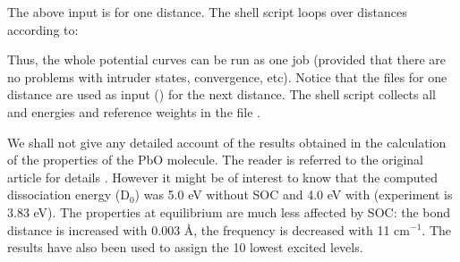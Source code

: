 The above input is for one distance. The shell script loops over distances
according to:


Thus, the whole potential curves can be run as one job (provided that there are
no problems with intruder states, convergence, etc). Notice that the
 files for one distance are used as input () for the
next distance. The shell script collects all  and 
 energies and reference weights in the file . 

We shall not give any detailed account of the results obtained in the
calculation of the properties of the PbO molecule. The reader is referred to the
original article for details \cite{Roos:03h}. However it might be of interest to
know that the computed dissociation energy (D$_0$) was 5.0 eV without SOC and
4.0 eV with (experiment is 3.83 eV). The properties at equilibrium are much less
affected by SOC: the bond distance is increased with 0.003 \AA, the frequency is
decreased with 11 cm$^{-1}$. The results have also been used to assign the 10
lowest excited levels. 
